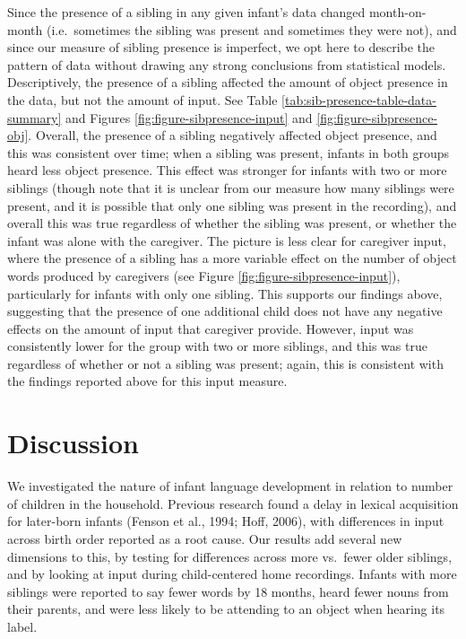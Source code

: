 \documentclass[
  man,mask,floatsintext]{apa6}
\begin{document}
Since the presence of a sibling in any given infant's data changed month-on-month (i.e.~sometimes the sibling was present and sometimes they were not), and since our measure of sibling presence is imperfect, we opt here to describe the pattern of data without drawing any strong conclusions from statistical models. Descriptively, the presence of a sibling affected the amount of object presence in the data, but not the amount of input. See Table \ref{tab:sib-presence-table-data-summary} and Figures \ref{fig:figure-sibpresence-input} and \ref{fig:figure-sibpresence-obj}. Overall, the presence of a sibling negatively affected object presence, and this was consistent over time; when a sibling was present, infants in both groups heard less object presence. This effect was stronger for infants with two or more siblings (though note that it is unclear from our measure how many siblings were present, and it is possible that only one sibling was present in the recording), and overall this was true regardless of whether the sibling was present, or whether the infant was alone with the caregiver. The picture is less clear for caregiver input, where the presence of a sibling has a more variable effect on the number of object words produced by caregivers (see Figure \ref{fig:figure-sibpresence-input}), particularly for infants with only one sibling. This supports our findings above, suggesting that the presence of one additional child does not have any negative effects on the amount of input that caregiver provide. However, input was consistently lower for the group with two or more siblings, and this was true regardless of whether or not a sibling was present; again, this is consistent with the findings reported above for this input measure.

\hypertarget{discussion}{%
\section{Discussion}\label{discussion}}

We investigated the nature of infant language development in relation to number of children in the household. Previous research found a delay in lexical acquisition for later-born infants (Fenson et al., 1994; Hoff, 2006), with differences in input across birth order reported as a root cause. Our results add several new dimensions to this, by testing for differences across more vs.~fewer older siblings, and by looking at input during child-centered home recordings. Infants with more siblings were reported to say fewer words by 18 months, heard fewer nouns from their parents, and were less likely to be attending to an object when hearing its label.
\end{document}
